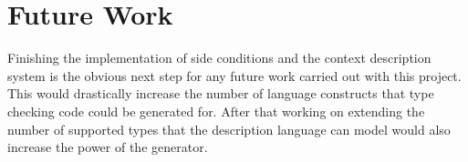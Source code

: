 \documentclass{UoYCSproject}
\begin{document}
\section{Future Work}
Finishing the implementation of side conditions and the context description 
system is the obvious next step for any future work carried out with this 
project. This would drastically increase the number of language constructs that 
type checking code could be generated for. After that working on extending
the number of supported types that the description language can model would also
increase the power of the generator.

\printbibliography
\end{document}
